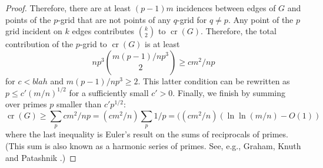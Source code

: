 \documentclass{patmorin}
\DeclareMathOperator{\crs}{cr}
\begin{document}
\begin{proof}
Therefore, there are at least $(p-1)m$ incidences between edges of $G$
and points of the $p$-grid that are not points of any $q$-grid for $q\neq p$.
Any point of the $p$ grid incident
on $k$ edges contributes $\binom{k}{2}$ to $\crs(G)$.  Therefore, the
total contribution of the $p$-grid to $\crs(G)$ is at least
\[
    np^3\binom{m(p-1)/np^3}{2} \ge cm^2/np
\]
for $c<blah$ and $m(p-1)/np^3 \ge 2$.  This latter condition can be rewritten
as $p \le c'(m/n)^{1/2}$ for a sufficiently small $c'>0$.
Finally, we finish by summing over primes $p$ smaller than $c'p^{1/2}$:
\[
   \crs(G) \ge \sum_{p} cm^2/np = (cm^2/n) \sum_{p} 1/p = ((cm^2/n)(\ln\ln(m/n)-O(1))
\]
where the last inequality is Euler's result on the sums of reciprocals
of primes. (This sum is also known as a harmonic series of primes.  See,
e.g., Graham, Knuth and Patashnik \cite[pages~22--25]{gkpXX}.)
\end{proof}

%
%
%
%
%
%
\end{document}
